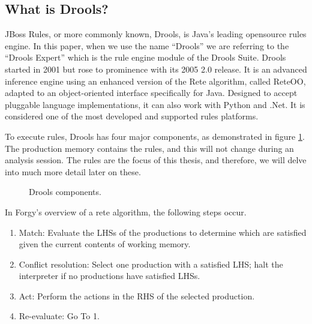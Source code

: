 \subsection{What is Drools?}\label{section:WhatIsDrools}

JBoss Rules, or more commonly known, Drools, is Java's leading opensource rules engine.
In this paper, when we use the name ``Drools'' we are referring to the ``Drools Expert'' which is the rule engine module of the Drools Suite.
Drools started in 2001 but rose to prominence with its 2005 2.0 release.
It is an advanced inference engine using an enhanced version of the Rete algorithm, called Rete\-OO\cite{sottara2010configurable}, adapted to an object-oriented interface specifically for Java.
Designed to accept pluggable language implementations, it can also work with Python and .Net.
It is considered one of the most developed and supported rules platforms.

To execute rules, Drools has four major components, as demonstrated in figure \ref{fig:Drools_components}.
The production memory contains the rules, and this will not change during an analysis session.
The rules are the focus of this thesis, and therefore, we will delve into much more detail later on these.

\begin{figure}[h]
    \centering
    \caption{Drools components.}
    \label{fig:Drools_components}
\end{figure}

In Forgy's\cite{forgy1989rete} overview of a rete algorithm, the following steps occur.
\begin{enumerate}
    \setlength\itemsep{0em}
    \item Match: Evaluate the LHSs of the productions to determine which are satisfied given the current contents of working memory.
    \item Conflict resolution: Select one production with a satisfied LHS; halt the interpreter if no productions have satisfied LHSs.
    \item Act: Perform the actions in the RHS of the selected production.
    \item Re-evaluate: Go To 1.
\end{enumerate}

